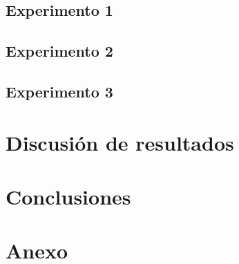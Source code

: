 \documentclass[12pt, titlepage]{article}
\begin{document}
\subsection{Experimento 1}
\subsection{Experimento 2}
\subsection{Experimento 3}
\section{Discusión de resultados}
\section{Conclusiones}


\section{Anexo}
\end{document}
